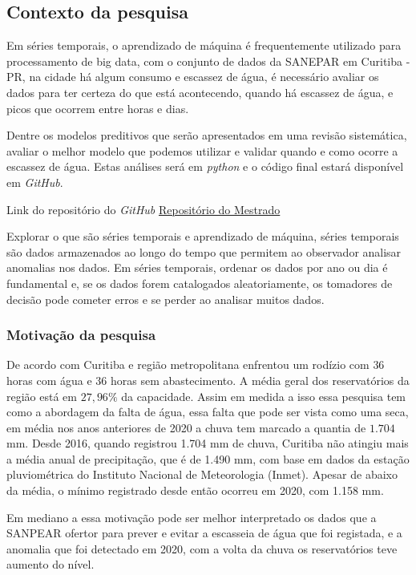 \subsection{Contexto da pesquisa} \label{subsec:contexto}
 Em séries temporais, o aprendizado de máquina é frequentemente utilizado para processamento de big data, com o conjunto de dados da SANEPAR em Curitiba - PR, na cidade há algum consumo e escassez de água, é necessário avaliar os dados para ter certeza do que está acontecendo, quando há escassez de água, e picos que ocorrem entre horas e dias.
 
 Dentre os modelos preditivos que serão apresentados em uma revisão sistemática, avaliar o melhor modelo que podemos utilizar e validar quando e como ocorre a escassez de água.
 Estas análises será em \textit{python} e o código final estará disponível em \textit{GitHub}.
 
 Link do repositório do \textit{GitHub} \href{https://github.com/Tchesko93/Mestre-Tchesko}{Repositório do Mestrado}
   
 Explorar o que são séries temporais e aprendizado de máquina, séries temporais são dados armazenados ao longo do tempo que permitem ao observador analisar anomalias nos dados. Em séries temporais, ordenar os dados por ano ou dia é fundamental e, se os dados forem catalogados aleatoriamente, os tomadores de decisão pode cometer erros e se perder ao analisar muitos dados.
   
      
\subsubsection{Motivação da pesquisa} \label{subsubsec:motivacao}
    
    De acordo com \cite{vasconcelos_2020} Curitiba e região metropolitana enfrentou um rodízio com $36$ horas com água e $36$ horas sem abastecimento. A média geral dos reservatórios da região está em $27,96\%$ da capacidade. Assim em medida a isso essa pesquisa tem como a abordagem da falta de água, essa falta que pode ser vista como uma seca, em média nos anos anteriores de 2020 a chuva tem marcado a quantia de $1.704$ mm. \cite{vasconcelos_2020} Desde 2016, quando registrou 1.704 mm de chuva, Curitiba não atingiu mais a média anual de precipitação, que é de 1.490 mm, com base em dados da estação pluviométrica do Instituto Nacional de Meteorologia (Inmet).  Apesar de abaixo da média, o mínimo registrado desde então ocorreu em 2020, com 1.158 mm.
    
    Em mediano a essa motivação pode ser melhor interpretado os dados que a SANPEAR ofertor para prever e evitar a escasseia de água que foi registada, e a anomalia que foi detectado em 2020, com a volta da chuva os reservatórios teve aumento do nível.
    